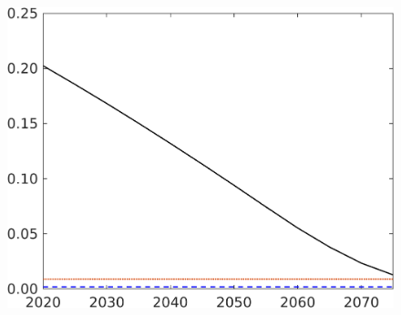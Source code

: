 \begin{figure}[h!!]
\begin{minipage}[]{0.32\textwidth}
	\end{minipage}
	\begin{minipage}[]{0.32\textwidth}
		\includegraphics[width=1\textwidth]{../../codding_model/own_basedOnFried/optimalPol_elastS_DisuSci/figures/all_1705/Extern_CompEff_sff_spillover0_noskill0_sep1_BN0_ineq0_red0_etaa0.79_lgd0.png}
	\end{minipage}
	
\end{figure}